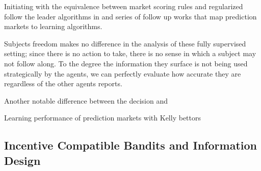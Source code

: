 

Initiating with the equivalence between market scoring rules and regularized follow the leader algorithms in \cite{chen2010new} and series of follow up works \cite{abernethy2013efficient, frongillo2012interpreting, hu2014multi, frongillo2015convergence,} that map prediction markets to learning algorithms. 

Subjects freedom makes no difference in the analysis of these fully supervised setting; since there is no action to take, there is no sense in which a subject may not follow along. To the degree the information they surface is not being used strategically by the agents, we can perfectly evaluate how accurate they are regardless of the other agents reports.





Another notable difference between the decision and 

Learning performance of prediction markets with Kelly bettors\cite{beygelzimer2012learning}

\subsection{Incentive Compatible Bandits and Information Design}



